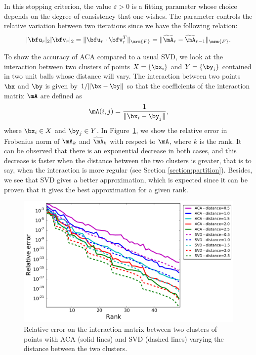 In this stopping criterion, the value $\varepsilon>0$ is a fitting parameter whose choice depends on the degree of consistency 
that one wishes. The parameter controls the relative variation between two iterations since we have the following relation:
\[
	\vert \bfu_{r}\vert_{2}\vert \bfv_{r}\vert_{2} = \Vert \bfu_r \cdot \bfv_r^T \Vert_{\mrm{F}} =  \Vert \widetilde{\mA}_{r} - \widetilde{\mA}_{r-1}\Vert_{\mrm{F}}.
\]

\bigskip

\begin{remark1}
\label{remark:err_decrease}
To show the accuracy of ACA compared to a usual SVD, we look at the interaction between two clusters of points $X=\{ \bx_i\}$ and $Y=\{ \by_i\}$ contained in two unit balls whose distance will vary. The interaction between two points $\bx$ and $\by$ is given by $1/ \Vert \bx -\by \Vert$ so that the coefficients of the interaction matrix $\mA$ are defined as 
\[
\mA (i,j) = \dfrac{1}{\Vert \bx_i - \by_j \Vert},
\]
where $\bx_i \in X$ and $\by_j \in Y$. In Figure~\ref{fig:err_decrease}, we show the relative error in Frobenius norm of $\mA_k$ and $\widetilde{\mA}_k$ with respect to $\mA$, where $k$ is the rank. It can be observed that there is an exponential decrease in both cases, and this decrease is faster when the distance between the two clusters is greater, that is to say, when the interaction is more regular (see Section \ref{section:partition}). Besides, we see that SVD gives a better approximation, which is expected since it can be proven that it gives the best approximation for a given rank.
\end{remark1}

\begin{figure}
\centering
\includegraphics[width=.9\textwidth]{../images/graphe_output_err_decrease}
\caption{Relative error on the interaction matrix between two clusters of points with ACA (solid lines) and SVD (dashed lines) varying the distance between the two clusters.}
\label{fig:err_decrease}
\end{figure}




